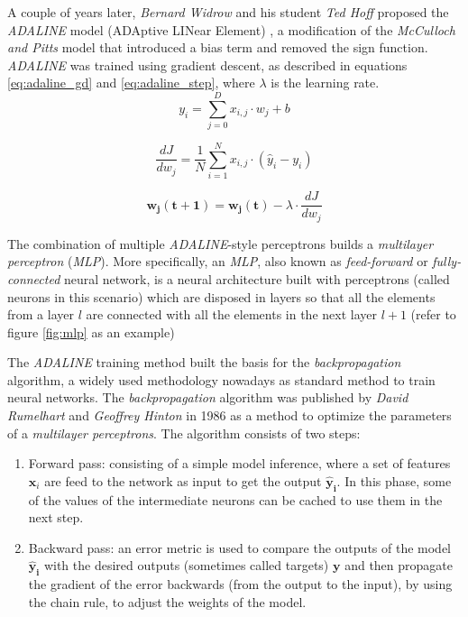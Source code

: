  A couple of years later, \textit{Bernard Widrow} and his student \textit{Ted Hoff} proposed the \textit{ADALINE} model (ADAptive LINear Element) \cite{widrow1960}, a modification of the \textit{McCulloch and Pitts} model that introduced a bias term and removed the sign function. \textit{ADALINE} was trained using gradient descent, as described in equations \ref{eq:adaline_gd} and \ref{eq:adaline_step}, where $\lambda$ is the learning rate. 
\begin{equation}
\label{eq:adaline_fp}
y_i = \sum_{j=0}^{D} x_{i,j} \cdot w_{j} + b
\end{equation}

\begin{equation}
\label{eq:adaline_gd}
\frac{dJ}{d{w_j}} = \frac{1}{N} \sum_{i=1}^{N} x_{i,j} \cdot(\hat{y}_i - y_i)
\end{equation}

\begin{equation}
\label{eq:adaline_step}
\mathbf{w_j(t+1)} = \mathbf{w_j(t)} - \lambda \cdot \frac{dJ}{d{w_j}}
\end{equation}


 The combination of multiple \textit{ADALINE}-style perceptrons builds a \textit{multilayer perceptron} (\textit{MLP}). More specifically, an \textit{MLP}, also known as \textit{feed-forward} or \textit{fully-connected} neural network, is a neural architecture built with perceptrons (called neurons in this scenario) which are disposed in layers so that all the elements from a layer $l$ are connected with all the elements in the next layer $l+1$ (refer to figure \ref{fig:mlp} as an example)
 
 
 The \textit{ADALINE} training method built the basis for the \textit{backpropagation} algorithm, a widely used methodology nowadays as standard method to train neural networks. The \textit{backpropagation} algorithm \cite{hinton1986} was published by \textit{David Rumelhart} and \textit{Geoffrey Hinton} in 1986 as a method to optimize the parameters of a \textit{multilayer perceptrons}. The algorithm consists of two steps:

\begin{enumerate}
\item Forward pass: consisting of a simple model inference, where a set of features $\mathbf{x}_i$ are feed to the network as input to get the output $\mathbf{\hat{y}_i}$. In this phase, some of the values of the intermediate neurons can be cached to use them in the next step.

\item Backward pass: an error metric is used to compare the outputs of the model $\mathbf{\hat{y}_i}$ with the desired outputs (sometimes called targets) $\mathbf{y}$ and then propagate the gradient of the error backwards (from the output to the input), by using the chain rule, to adjust the weights of the model. 
\end{enumerate}


